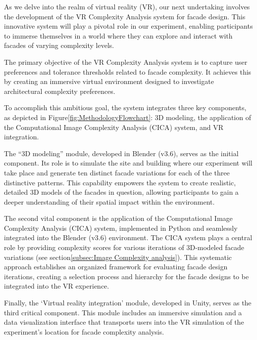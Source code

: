 
As we delve into the realm of virtual reality (VR), our next undertaking involves the development of the VR Complexity Analysis system for facade design.
This innovative system will play a pivotal role in our experiment, enabling participants to immerse themselves in a world where they can explore and interact with facades of varying complexity levels.

The primary objective of the VR Complexity Analysis system is to capture user preferences and tolerance thresholds related to facade complexity.
It achieves this by creating an immersive virtual environment designed to investigate architectural complexity preferences.

To accomplish this ambitious goal, the system integrates three key components, as depicted in Figure\ref{fig:MethodologyFlowchart}: 3D modeling, the application of the Computational Image Complexity Analysis (CICA) system, and VR integration.

The ``3D modeling'' module, developed in Blender (v3.6), serves as the initial component.
Its role is to simulate the site and building where our experiment will take place and generate ten distinct facade variations for each of the three distinctive patterns.
This capability empowers the system to create realistic, detailed 3D models of the facades in question, allowing participants to gain a deeper understanding of their spatial impact within the environment.

The second vital component is the application of the Computational Image Complexity Analysis (CICA) system, implemented in Python and seamlessly integrated into the Blender (v3.6) environment.
The CICA system plays a central role by providing complexity scores for various iterations of 3D-modeled facade variations (see section\ref{subsec:Image Complexity analysis}).
This systematic approach establishes an organized framework for evaluating facade design iterations, creating a selection process and hierarchy for the facade designs to be integrated into the VR experience.

Finally, the `Virtual reality integration' module, developed in Unity, serves as the third critical component.
This module includes an immersive simulation and a data visualization interface that transports users into the VR simulation of the experiment's location for facade complexity analysis.

